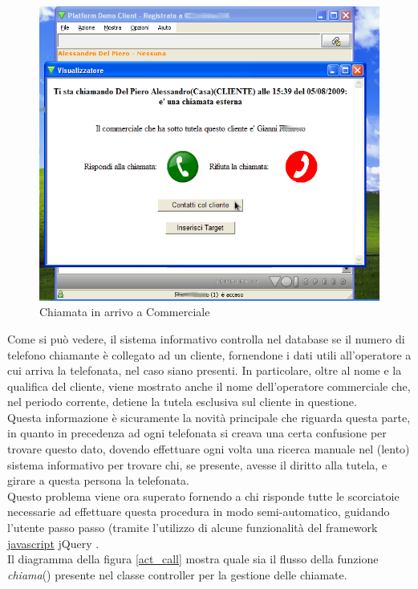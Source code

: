 \begin{figure}[!ht]
\centering
  \includegraphics[scale=0.8]{./images/chiamata_commerciale.png}
\caption{Chiamata in arrivo a Commerciale}
\label{chiamata_comm}
\end{figure}

\noindent
Come si pu\`o vedere, il sistema informativo controlla nel database se il numero di telefono chiamante \`e collegato ad un cliente, fornendone i dati utili all'operatore a cui arriva la telefonata, nel caso siano presenti. In particolare, oltre al nome e la qualifica del cliente, viene mostrato anche il nome dell'operatore commerciale che, nel periodo corrente, detiene la tutela esclusiva sul cliente in questione. \\
Questa informazione \`e sicuramente la novit\`a principale che riguarda questa parte, in quanto in precedenza ad ogni telefonata si creava una certa confusione per trovare questo dato, dovendo effettuare ogni volta una ricerca manuale nel (lento) sistema informativo per trovare chi, se presente, avesse il diritto alla tutela, e girare a questa persona la telefonata. \\
Questo problema viene ora superato fornendo a chi risponde tutte le scorciatoie necessarie ad effettuare questa procedura in modo semi-automatico, guidando l'utente passo passo (tramite l'utilizzo di alcune funzionalit\`a del framework \hyperlink{javascript}{\underline{javascript}} jQuery \cite{jquery}. \\
Il diagramma della figura \ref{act_call} mostra quale sia il flusso della funzione \textit{chiama}() presente nel classe controller per la gestione delle chiamate. 

